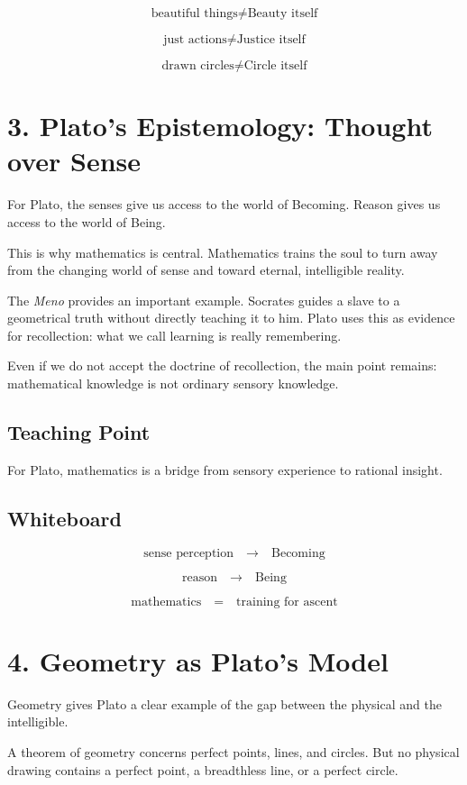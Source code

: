 \documentclass[11pt]{article}
\begin{document}
\[
\text{beautiful things} \neq \text{Beauty itself}
\]

\[
\text{just actions} \neq \text{Justice itself}
\]

\[
\text{drawn circles} \neq \text{Circle itself}
\]

\section*{3. Plato's Epistemology: Thought over Sense}

For Plato, the senses give us access to the world of Becoming. Reason gives us access to
the world of Being.

This is why mathematics is central. Mathematics trains the soul to turn away from the
changing world of sense and toward eternal, intelligible reality.

The \emph{Meno} provides an important example. Socrates guides a slave to a geometrical
truth without directly teaching it to him. Plato uses this as evidence for recollection: what
we call learning is really remembering.

Even if we do not accept the doctrine of recollection, the main point remains:
mathematical knowledge is not ordinary sensory knowledge.

\subsection*{Teaching Point}

For Plato, mathematics is a bridge from sensory experience to rational insight.

\subsection*{Whiteboard}

\[
\text{sense perception}
\quad \longrightarrow \quad
\text{Becoming}
\]

\[
\text{reason}
\quad \longrightarrow \quad
\text{Being}
\]

\[
\text{mathematics}
\quad =
\quad
\text{training for ascent}
\]

\section*{4. Geometry as Plato's Model}

Geometry gives Plato a clear example of the gap between the physical and the intelligible.

A theorem of geometry concerns perfect points, lines, and circles. But no physical drawing
contains a perfect point, a breadthless line, or a perfect circle.
\end{document}
